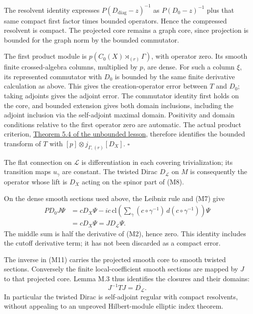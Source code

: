 \documentclass[
  11pt,
]{article}
\begin{document}
The resolvent identity expresses \(P(D_{\mathrm{diag}}-z)^{-1}\) as
\(P(D_0-z)^{-1}\) plus that same compact first factor times bounded
operators. Hence the compressed resolvent is compact. The projected core
remains a graph core, since projection is bounded for the graph norm by
the bounded commutator.

The first product module is \(p(C_0(X)\rtimes_{(r)}\Gamma)\), with
operator zero. Its smooth finite crossed-algebra columns, multiplied by
\(p\), are dense. For such a column \(\xi\), its represented commutator
with \(D_0\) is bounded by the same finite derivative calculation as
above. This gives the creation-operator error between \(T\) and \(D_0\);
taking adjoints gives the adjoint error. The commutator identity first
holds on the core, and bounded extension gives both domain inclusions,
including the adjoint inclusion via the self-adjoint maximal domain.
Positivity and domain conditions relative to the first operator zero are
automatic. The actual product criterion,
\href{KT-KK-11.html\#5-recognizing-unbounded-products}{Theorem 5.4 of
the unbounded lesson}, therefore identifies the bounded transform of
\(T\) with \([p]\otimes j_{\Gamma,(r)}[D_X]\). \(\square\)

The flat connection on \(\mathcal L\) is differentiation in each
covering trivialization; its transition maps \(u_\gamma\) are constant.
The twisted Dirac \(D_{\mathcal L}\) on \(M\) is consequently the
operator whose lift is \(D_X\) acting on the spinor part of (M8).

On the dense smooth sections used above, the Leibniz rule and (M7) give
\[
\begin{aligned}
PD_0J\Psi
&=c D_X\Psi
   -ic\,\mathrm{cl}\!\left(
       \sum_\gamma(c\circ\gamma^{-1})\,d(c\circ\gamma^{-1})
                     \right)\Psi\\
&=cD_X\Psi=JD_{\mathcal L}\Psi.
\end{aligned}
\tag{M13}
\] The middle sum is half the derivative of (M2), hence zero. This
identity includes the cutoff derivative term; it has not been discarded
as a compact error.

The inverse in (M11) carries the projected smooth core to smooth twisted
sections. Conversely the finite local-coefficient smooth sections are
mapped by \(J\) to that projected core. Lemma M.3 thus identifies the
closures and their domains: \[
J^{-1}TJ=\overline{D_{\mathcal L}}.
\tag{M14}
\] In particular the twisted Dirac is self-adjoint regular with compact
resolvents, without appealing to an unproved Hilbert-module elliptic
index theorem.
\end{document}
